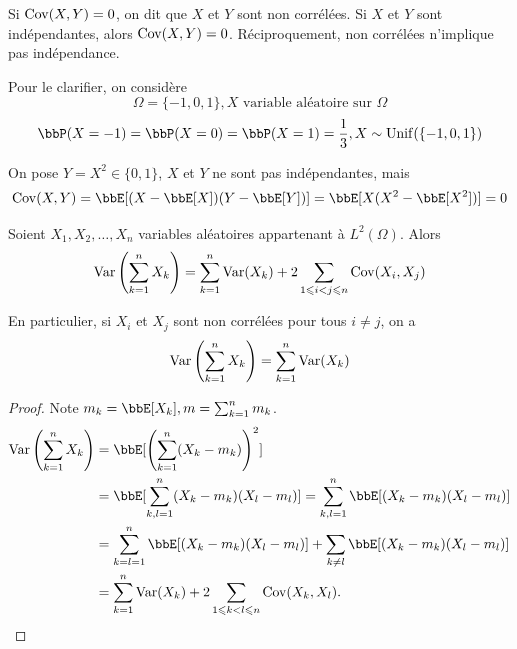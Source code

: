 \begin{rqq}
    Si $\operatorname{Cov}(X, Y) = 0$, on dit que $X$ et $Y$ sont non corrélées.
    Si $X$ et $Y$ sont indépendantes, alors $\operatorname{Cov}(X, Y) = 0$.
    Réciproquement, non corrélées n'implique pas indépendance.
\end{rqq}

\begin{exem}
    Pour le clarifier, on considère
    \[ \Omega = \{ -1, 0, 1 \}, X \text{ variable aléatoire sur } \Omega \]
    \[ \bbP(X = -1) = \bbP(X = 0) = \bbP(X = 1) = \frac{1}{3}, X \sim \unif(\{ -1, 0, 1 \}) \]

    On pose $Y = X^2 \in \{ 0, 1 \}$, $X$ et $Y$ ne sont pas indépendantes, mais
    \[ \cov(X, Y) = \bbE[(X - \bbE[X])(Y - \bbE[Y])] = \bbE[X(X^2 - \bbE[X^2])] = 0 \]
\end{exem}

\begin{prop}
    Soient $X_1, X_2, \ldots, X_n$ variables aléatoires appartenant à $L^2(\Omega)$. Alors
    \[ \operatorname{Var} \left(\sum_{k = 1}^n X_k\right) =
        \sum_{k = 1}^n \operatorname{Var}(X_k) + 2 \sum_{1 \leqslant i < j \leqslant n} \operatorname{Cov}(X_i, X_j) \]

    En particulier, si $X_i$ et $X_j$ sont non corrélées pour tous $i \neq j$, on a
    \[ \operatorname{Var} \left(\sum_{k = 1}^n X_k\right) = \sum_{k = 1}^n \operatorname{Var}(X_k) \]
\end{prop}

\begin{proof}
    Note $m_k = \bbE[X_k], m = \sum_{k = 1}^n m_k$.
    \begin{align*}
        \var \left(\sum_{k = 1}^n X_k\right) & = \bbE[\left(\sum_{k = 1}^n (X_k - m_k)\right)^2]                                                \\
                                             & = \bbE[\sum_{k, l = 1}^n(X_k - m_k)(X_l - m_l)] = \sum_{k, l = 1}^n \bbE[(X_k - m_k)(X_l - m_l)] \\
                                             & = \sum_{k = l = 1}^n \bbE[(X_k - m_k)(X_l - m_l)] + \sum_{k \neq l} \bbE[(X_k - m_k)(X_l - m_l)] \\
                                             & = \sum_{k = 1}^n \var(X_k) + 2 \sum_{1 \leqslant k < l \leqslant n} \cov(X_k, X_l).
    \end{align*}
\end{proof}

